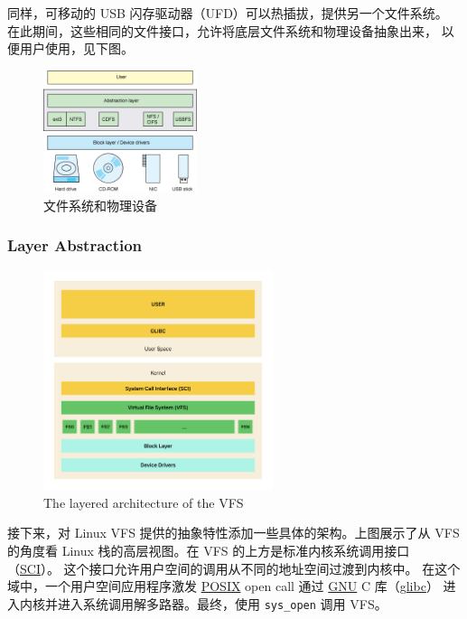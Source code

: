 \documentclass[UTF8,a4paper]{ctexart}
\newcommand{\code}{\texttt}
\begin{document}
同样，可移动的 USB
闪存驱动器（UFD）可以热插拔，提供另一个文件系统。
在此期间，这些相同的文件接口，允许将底层文件系统和物理设备抽象出来，
以便用户使用，见下图。

\begin{figure}[H]
    \centering
    \includegraphics[width=0.4\textwidth]{figure1.jpg}
    \caption{文件系统和物理设备}
\end{figure}

\subsubsection{Layer Abstraction}

\begin{figure}[H]
    \centering
    \includegraphics[width=0.6\textwidth]{The layered architecture of the VFS.png}
    \caption{The layered architecture of the VFS}
\end{figure}

接下来，对 Linux VFS 提供的抽象特性添加一些具体的架构。上图展示了从 VFS
的角度看 Linux 栈的高层视图。在 VFS
的上方是标准内核系统调用接口
（\href{https://en.wikipedia.org/wiki/Scalable_Coherent_Interface}{SCI}）。
这个接口允许用户空间的调用从不同的地址空间过渡到内核中。
在这个域中，一个用户空间应用程序激发
\href{https://en.wikipedia.org/wiki/POSIX}{POSIX} open call 通过
\href{https://en.wikipedia.org/wiki/GNU}{GNU} C
库（\href{https://en.wikipedia.org/wiki/Glibc}{glibc}）
进入内核并进入系统调用解多路器。最终，使用
\code{sys\_open} 调用 VFS。
\end{document}
